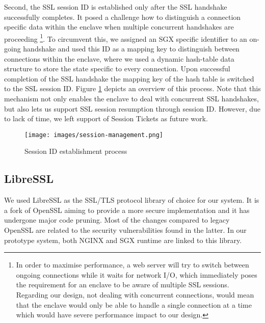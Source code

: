 \documentclass[../main.tex]{subfiles}
\begin{document}
Second, the SSL session ID is established only after the SSL handshake successfully completes. It posed a challenge how to distinguish a connection
specific data within the enclave when multiple concurrent handshakes are
proceeding \footnote{In order to maximise performance, a web server will try
to switch between ongoing connections while it waits for network I/O, which
immediately poses the requirement for an enclave to be aware of multiple SSL
sessions. Regarding our design, not dealing with concurrent connections, would
mean that the  enclave would only be able to handle a single connection at
a time which would have severe performance impact to our design.}.
To circumvent this, we assigned an SGX specific identifier to an on-going
handshake and used this ID as a mapping key to distinguish between connections
within the enclave, where we used a dynamic hash-table data structure to store
the state specific to every connection. Upon successful completion of the SSL
handshake the mapping key of the hash table is switched to the SSL session ID.
Figure \ref{fig:session-management} depicts an overview of this process. Note
that this mechanism not only enables the enclave to deal with concurrent SSL
handshakes, but also lets us support SSL session resumption through session ID.
However, due to lack of time, we left support of Session Tickets as future
work. 

\begin{figure}[H]
  \centering
  \texttt{[image: images/session-management.png]}
  \caption{Session ID establishment process}
  \label{fig:session-management}
\end{figure}

\subsection{LibreSSL}
\label{subsec:libressl}
We used LibreSSL as the SSL/TLS protocol library of choice for our system. It
is a fork of OpenSSL aiming to provide a more secure implementation and it has
undergone major code pruning. Most of the changes compared to legacy OpenSSL
are related to the security vulnerabilities found in the latter. In our
prototype system, both NGINX and SGX runtime are linked to this library.
\end{document}
